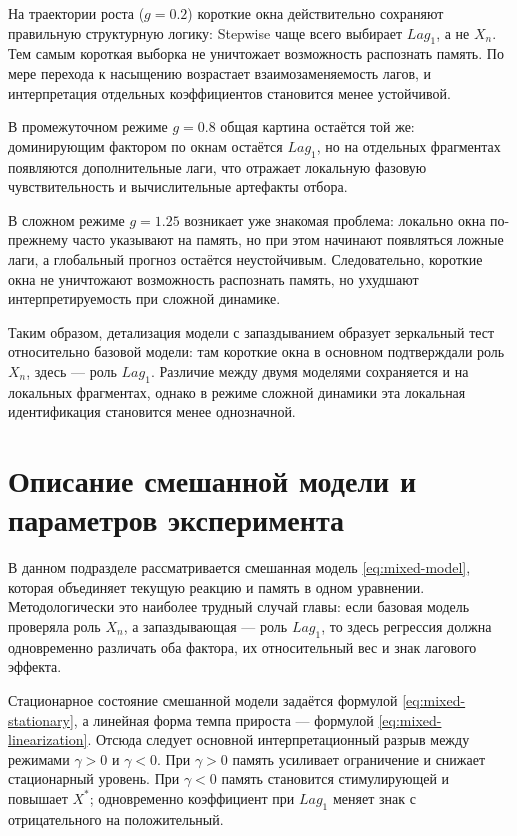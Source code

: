 На траектории роста (\(g=0.2\)) короткие окна действительно сохраняют правильную структурную логику: Stepwise чаще всего выбирает \(Lag_1\), а не \(X_n\). Тем самым короткая выборка не уничтожает возможность распознать память. По мере перехода к насыщению возрастает взаимозаменяемость лагов, и интерпретация отдельных коэффициентов становится менее устойчивой.

В промежуточном режиме \(g=0.8\) общая картина остаётся той же: доминирующим фактором по окнам остаётся \(Lag_1\), но на отдельных фрагментах появляются дополнительные лаги, что отражает локальную фазовую чувствительность и вычислительные артефакты отбора.

В сложном режиме \(g=1.25\) возникает уже знакомая проблема: локально окна по-прежнему часто указывают на память, но при этом начинают появляться ложные лаги, а глобальный прогноз остаётся неустойчивым. Следовательно, короткие окна не уничтожают возможность распознать память, но ухудшают интерпретируемость при сложной динамике.

Таким образом, детализация модели с запаздыванием образует зеркальный тест относительно базовой модели: там короткие окна в основном подтверждали роль \(X_n\), здесь --- роль \(Lag_1\). Различие между двумя моделями сохраняется и на локальных фрагментах, однако в режиме сложной динамики эта локальная идентификация становится менее однозначной.

\section{Описание смешанной модели и параметров эксперимента}
\label{sec:opisanie-smeshannoi-modeli-i-parametrov-eksperimenta}

В данном подразделе рассматривается смешанная модель \eqref{eq:mixed-model}, которая объединяет текущую реакцию и память в одном уравнении. Методологически это наиболее трудный случай главы: если базовая модель проверяла роль \(X_n\), а запаздывающая --- роль \(Lag_1\), то здесь регрессия должна одновременно различать оба фактора, их относительный вес и знак лагового эффекта.

Стационарное состояние смешанной модели задаётся формулой \eqref{eq:mixed-stationary}, а линейная форма темпа прироста --- формулой \eqref{eq:mixed-linearization}. Отсюда следует основной интерпретационный разрыв между режимами \(\gamma>0\) и \(\gamma<0\). При \(\gamma>0\) память усиливает ограничение и снижает стационарный уровень. При \(\gamma<0\) память становится стимулирующей и повышает \(X^*\); одновременно коэффициент при \(Lag_1\) меняет знак с отрицательного на положительный.

